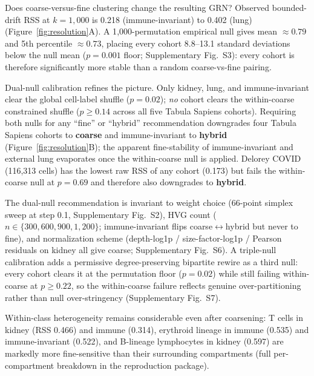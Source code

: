 \documentclass[unnumsec,webpdf,contemporary,large,namedate]{oup-authoring-template}
\begin{document}
Does coarse-versus-fine clustering change the resulting GRN? Observed
bounded-drift RSS at $k = 1{,}000$ is 0.218 (immune-invariant) to
0.402 (lung) (Figure~\ref{fig:resolution}A). A 1{,}000-permutation
empirical null gives mean $\approx 0.79$ and 5th percentile $\approx 0.73$,
placing every cohort 8.8--13.1 standard deviations below the null mean
($p = 0.001$ floor; Supplementary Fig.~S3): every cohort is therefore
significantly more stable than a random coarse-vs-fine pairing.

Dual-null calibration refines the picture. Only kidney, lung, and
immune-invariant clear the global cell-label shuffle ($p = 0.02$);
\emph{no} cohort clears the within-coarse constrained shuffle
($p \geq 0.14$ across all five Tabula Sapiens cohorts). Requiring both
nulls for any ``fine'' or ``hybrid'' recommendation downgrades four
Tabula Sapiens cohorts to \textbf{coarse} and immune-invariant to
\textbf{hybrid} (Figure~\ref{fig:resolution}B); the apparent
fine-stability of immune-invariant and external lung evaporates once
the within-coarse null is applied. Delorey COVID (116{,}313 cells)
has the lowest raw RSS of any cohort (0.173) but fails the
within-coarse null at $p = 0.69$ and therefore also downgrades to
\textbf{hybrid}.

The dual-null recommendation is invariant to weight choice
(66-point simplex sweep at step 0.1, Supplementary Fig.~S2),
HVG count ($n \in \{300, 600, 900, 1{,}200\}$; immune-invariant
flips coarse$\leftrightarrow$hybrid but never to fine), and
normalization scheme (depth-log1p / size-factor-log1p / Pearson
residuals on kidney all give coarse; Supplementary Fig.~S6). A
triple-null calibration adds a permissive degree-preserving bipartite
rewire as a third null: every cohort clears it at the permutation
floor ($p = 0.02$) while still failing within-coarse at $p \geq 0.22$,
so the within-coarse failure reflects genuine over-partitioning rather
than null over-stringency (Supplementary Fig.~S7).

Within-class heterogeneity remains considerable even after coarsening:
T cells in kidney (RSS 0.466) and immune (0.314), erythroid lineage
in immune (0.535) and immune-invariant (0.522), and B-lineage
lymphocytes in kidney (0.597) are markedly more fine-sensitive than
their surrounding compartments (full per-compartment breakdown in the
reproduction package).
\end{document}
